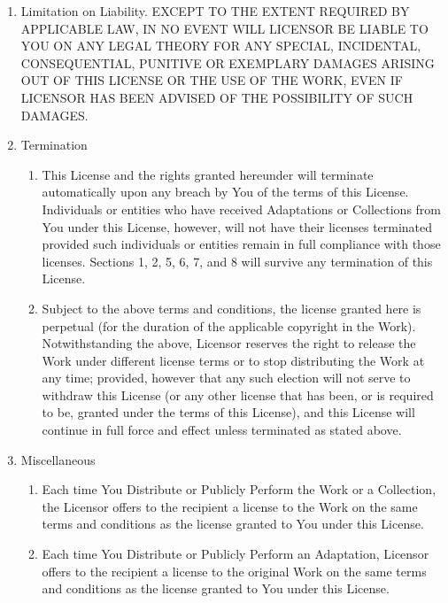 \documentclass[letterpaper,10pt,english]{manual}
\begin{document}
\begin{enumerate}
\item {} 
Limitation on Liability. EXCEPT TO THE EXTENT REQUIRED BY APPLICABLE LAW, IN NO EVENT WILL LICENSOR BE LIABLE TO YOU ON ANY LEGAL THEORY FOR ANY SPECIAL, INCIDENTAL, CONSEQUENTIAL, PUNITIVE OR EXEMPLARY DAMAGES ARISING OUT OF THIS LICENSE OR THE USE OF THE WORK, EVEN IF LICENSOR HAS BEEN ADVISED OF THE POSSIBILITY OF SUCH DAMAGES.

\item {} 
Termination
\begin{enumerate}
\item {} 
This License and the rights granted hereunder will terminate automatically upon any breach by You of the terms of this License. Individuals or entities who have received Adaptations or Collections from You under this License, however, will not have their licenses terminated provided such individuals or entities remain in full compliance with those licenses. Sections 1, 2, 5, 6, 7, and 8 will survive any termination of this License.

\item {} 
Subject to the above terms and conditions, the license granted here is perpetual (for the duration of the applicable copyright in the Work). Notwithstanding the above, Licensor reserves the right to release the Work under different license terms or to stop distributing the Work at any time; provided, however that any such election will not serve to withdraw this License (or any other license that has been, or is required to be, granted under the terms of this License), and this License will continue in full force and effect unless terminated as stated above.

\end{enumerate}

\item {} 
Miscellaneous
\begin{enumerate}
\item {} 
Each time You Distribute or Publicly Perform the Work or a Collection, the Licensor offers to the recipient a license to the Work on the same terms and conditions as the license granted to You under this License.

\item {} 
Each time You Distribute or Publicly Perform an Adaptation, Licensor offers to the recipient a license to the original Work on the same terms and conditions as the license granted to You under this License.


\end{enumerate}
\end{enumerate}
\end{document}
